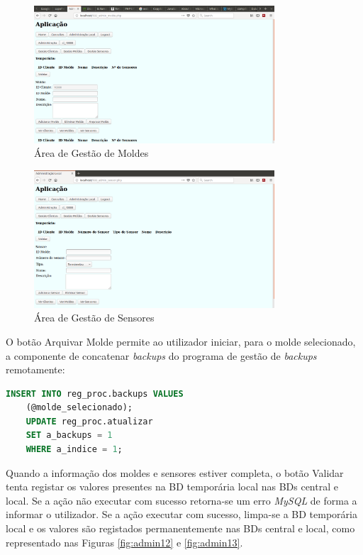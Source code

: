 \documentclass[11pt,twoside,a4paper]{report}
\begin{document}
\begin{figure}[H]
	\centering
		\includegraphics[width=0.8\textwidth]{administracao05} %
		\caption{Área de Gestão de Moldes}
		\label{fig:admin9}
\end{figure}
\begin{figure}[H]
	\centering
		\includegraphics[width=0.8\textwidth]{administracao06} %
		\caption{Área de Gestão de Sensores}
		\label{fig:admin10}
\end{figure}
O botão Arquivar Molde permite ao utilizador iniciar, para o molde selecionado, a componente de concatenar \textit{backups} do programa de gestão de \textit{backups} remotamente:
\begin{lstlisting}[language = SQL]
	INSERT INTO reg_proc.backups VALUES
	(@molde_selecionado);
	UPDATE reg_proc.atualizar
	SET a_backups = 1
	WHERE a_indice = 1;
\end{lstlisting} 
Quando a informação dos moldes e sensores estiver completa, o botão Validar tenta registar os valores presentes na BD temporária local nas BDs central e local. Se a ação não executar com sucesso retorna-se um erro \textit{MySQL} de forma a informar o utilizador. Se a ação executar com sucesso, limpa-se a BD temporária local e os valores são registados permanentemente nas BDs central e local, como representado nas Figuras \ref{fig:admin12} e \ref{fig:admin13}.\par
\end{document}
